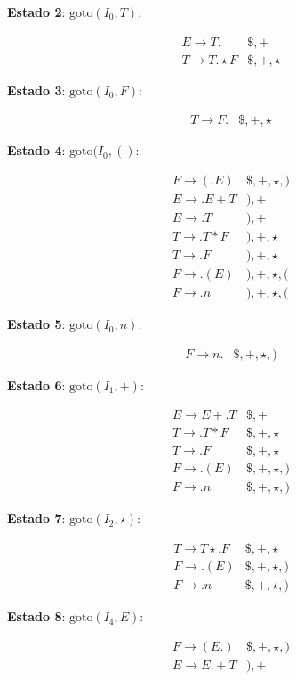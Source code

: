 \textbf{Estado 2}: \(\text{goto}(I_0, T)\):

\[
\begin{array}{ll}
E \to T . & \$,+ \\
T \to T . \star F & \$,+,\star
\end{array}
\]

\textbf{Estado 3}: \(\text{goto}(I_0, F)\):

\[
\begin{array}{ll}
T \to F . & \$,+,\star
\end{array}
\]

\textbf{Estado 4}: \(\text{goto}(I_0, ()\):

\[
\begin{array}{ll}
F \to ( . E ) & \$,+,\star,) \\
E \to . E + T & ),+ \\
E \to . T & ),+ \\
T \to . T * F & ),+,\star \\
T \to . F & ),+,\star \\
F \to . ( E ) & ),+,\star,( \\
F \to . n & ),+,\star,(
\end{array}
\]

\textbf{Estado 5}: \(\text{goto}(I_0, n)\):

\[
\begin{array}{ll}
F \to n . & \$,+,\star,)
\end{array}
\]

\textbf{Estado 6}: \(\text{goto}(I_1, +)\):

\[
\begin{array}{ll}
E \to E + . T & \$,+ \\
T \to . T * F & \$,+,\star \\
T \to . F & \$,+,\star \\
F \to . ( E ) & \$,+,\star,) \\
F \to . n & \$,+,\star,)
\end{array}
\]

\textbf{Estado 7}: \(\text{goto}(I_2, \star)\):

\[
\begin{array}{ll}
T \to T \star . F & \$,+,\star \\
F \to . ( E ) & \$,+,\star,) \\
F \to . n & \$,+,\star,)
\end{array}
\]

\textbf{Estado 8}: \(\text{goto}(I_4, E)\):

\[
\begin{array}{ll}
F \to ( E . ) & \$,+,\star,) \\
E \to E . + T & ),+
\end{array}
\]


